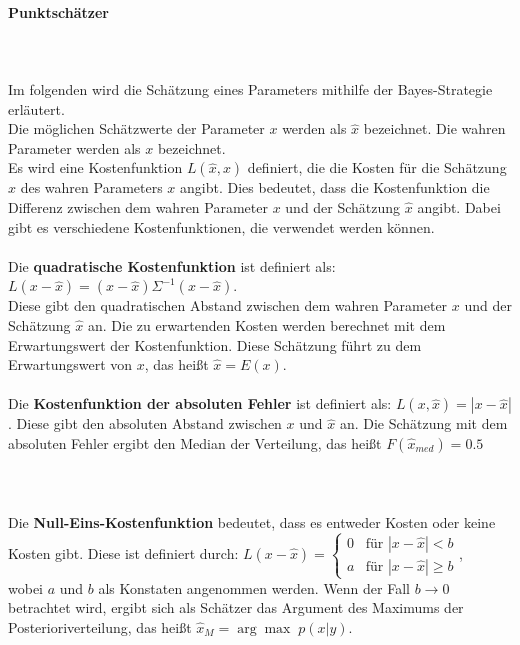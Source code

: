 \documentclass[a4paper,12pt]{article}
\begin{document}
\paragraph{Punktschätzer} \mbox{}\\\\
Im folgenden wird die Schätzung eines Parameters mithilfe der Bayes-Strategie erläutert. \\
Die möglichen Schätzwerte der Parameter $x$ werden als $\hat{x}$ bezeichnet. Die wahren Parameter werden als $x$ bezeichnet. \\
Es wird eine Kostenfunktion $L(\hat{x},x)$ definiert, die die Kosten für die Schätzung $\hat{x}$ des wahren Parameters $x$ angibt.
Dies bedeutet, dass die Kostenfunktion die Differenz zwischen dem wahren Parameter $x$ und der Schätzung $\hat{x}$ angibt.
Dabei gibt es verschiedene Kostenfunktionen, die verwendet werden können. \parencite[65]{EinfBayesStatistik} \\\\
Die \textbf{quadratische Kostenfunktion} ist definiert als: $L(x-\hat{x}) = (x-\hat{x})\Sigma^{-1}(x-\hat{x})$. \\
Diese gibt den quadratischen Abstand zwischen dem wahren Parameter $x$ und der Schätzung $\hat{x}$ an.
Die zu erwartenden Kosten werden berechnet mit dem Erwartungswert der Kostenfunktion.
Diese Schätzung führt zu dem Erwartungswert von $x$, das heißt $\hat{x} = E(x)$. \parencite[65-66]{EinfBayesStatistik} \\\\
Die \textbf{Kostenfunktion der absoluten Fehler} ist definiert als: $L(x,\hat{x}) = |x-\hat{x}|$.
Diese gibt den absoluten Abstand zwischen $x$ und $\hat{x}$ an.
Die Schätzung mit dem absoluten Fehler ergibt den Median der Verteilung, das heißt $F(\hat{x}_{med}) = 0.5$ \parencite[67-68]{EinfBayesStatistik} \\\\\\\\
Die \textbf{Null-Eins-Kostenfunktion} bedeutet, dass es entweder Kosten oder keine Kosten gibt.
Diese ist definiert durch: $L(x-\hat{x}) = 
\begin{cases}
  0 & \text{für } |x-\hat{x}| < b \\
  a & \text{für } |x-\hat{x}| \geq b
\end{cases}$,\\
wobei $a$ und $b$ als Konstaten angenommen werden. Wenn der Fall $b \to 0$ betrachtet wird,
ergibt sich als Schätzer das Argument des Maximums der Posterioriverteilung, das heißt $\hat{x}_M = \arg \max \; p(x|y)$. \parencite[68-69]{EinfBayesStatistik}\\\\
\end{document}
